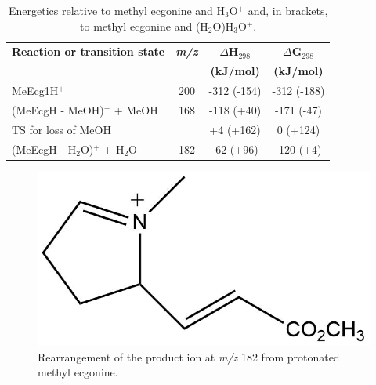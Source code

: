 \begin{table}[htbp]
\centering
\caption{Energetics relative to methyl ecgonine and H$_3$O$^+$ and, in brackets, to methyl ecgonine and (H$_2$O)H$_3$O$^+$. }
\label{tb:me2}
\begin{tabular}{lccc}
\toprule
\textbf{Reaction or transition state}	&\textbf{\textit{m/z} } &\textbf{$\Delta$H$_{298}$} &\textbf{$\Delta$G$_{298}$}\\
& &	\textbf{(kJ/mol)} &\textbf{(kJ/mol)} \\  \toprule
MeEcg1H$^+$   				&	200	& -312 (-154)  & -312 (-188) \\ \midrule
(MeEcgH - MeOH)$^+$ + MeOH	&	168	& -118 (+40)  & -171 (-47)   \\ \midrule
TS for loss of MeOH			&		& +4 (+162)  	& 0 (+124)   		\\ \midrule
(MeEcgH - H$_2$O)$^+$ + H$_2$O	&	182	& -62 (+96)  & -120 (+4)   \\ 
\bottomrule
\end{tabular}
\end{table}


\begin{figure}[htbp]
\centering
\includegraphics[width=0.3\linewidth]{pics/cocaine-chapter/meecg_frag.png}
\caption{Rearrangement of the product ion at \textit{m/z} 182 from protonated methyl ecgonine.}
\label{fig:MeEcg_fragment}
\end{figure}





















